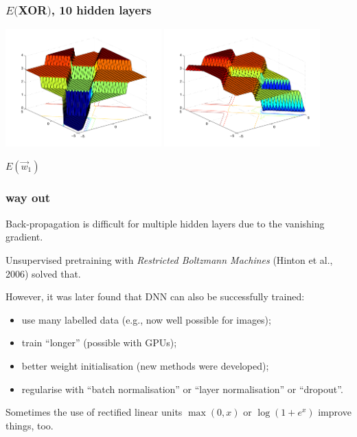 \documentclass[USenglish,pdftex,compress,10pt,svgnamesi,handout]{beamer}
\begin{document}
\begin{frame}
\frametitle{$E($XOR$)$, 10 hidden layers}
\includegraphics[width=6cm]{pics/xor_in1_10hidden}
\includegraphics[width=6cm]{pics/xor_in2_10hidden}

$E(\Vec w_1)$
\end{frame}




\begin{frame}
\frametitle{way out}
Back-propagation is difficult for multiple hidden layers due to the vanishing gradient.

Unsupervised pretraining with \textsl{Restricted Boltzmann Machines} (Hinton et al., 2006) solved that.

However, it was later found that DNN can also be successfully  trained:
\begin{itemize}
  \item use many labelled data (e.g., now well possible for images);
  \item train ``longer'' (possible with GPUs);
  \item better weight initialisation (new methods were developed);
  \item regularise with ``batch normalisation'' or ``layer normalisation'' or ``dropout''.
\end{itemize}

Sometimes the use of rectified linear units $\max(0,x)$ or $\log(1+e^x)$ improve things, too.

\end{frame}
\end{document}

